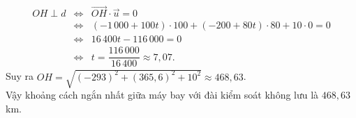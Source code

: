\begin{bt}
{\begin{enumerate}
			\begin{eqnarray*}
				OH\perp d &\Leftrightarrow& \overrightarrow{OH} \cdot \overrightarrow{u}=0\\
				&\Leftrightarrow&(-1\,000+100t)\cdot 100+(-200+80t)\cdot 80+10\cdot 0=0\\
				&\Leftrightarrow&16\,400t-116\,000=0\\
				&\Leftrightarrow&t=\dfrac{116\,000}{16\,400}\approx 7{,}07.
			\end{eqnarray*}
			Suy ra $OH=\sqrt{(-293)^2+(365{,}6)^2+10^2}\approx 468{,}63$.\\
			Vậy khoảng cách ngắn nhất giữa máy bay với đài kiểm soát không lưu là $468{,}63$\,km.
		\end{enumerate}
	}
\end{bt}


